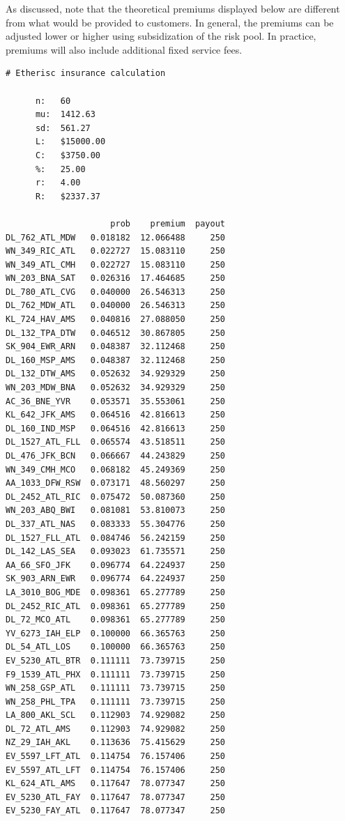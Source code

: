 \documentclass[12pt]{article}
\begin{document}
As discussed, note that the theoretical premiums displayed below are different from what would be provided to customers. In general, the premiums can be adjusted lower or higher using subsidization of the risk pool. In practice, premiums will also include additional fixed service fees.

\begin{verbatim}# Etherisc insurance calculation

      n:   60
      mu:  1412.63
      sd:  561.27
      L:   $15000.00
      C:   $3750.00
      %:   25.00
      r:   4.00
      R:   $2337.37
    
                     prob    premium  payout
DL_762_ATL_MDW   0.018182  12.066488     250
WN_349_RIC_ATL   0.022727  15.083110     250
WN_349_ATL_CMH   0.022727  15.083110     250
WN_203_BNA_SAT   0.026316  17.464685     250
DL_780_ATL_CVG   0.040000  26.546313     250
DL_762_MDW_ATL   0.040000  26.546313     250
KL_724_HAV_AMS   0.040816  27.088050     250
DL_132_TPA_DTW   0.046512  30.867805     250
SK_904_EWR_ARN   0.048387  32.112468     250
DL_160_MSP_AMS   0.048387  32.112468     250
DL_132_DTW_AMS   0.052632  34.929329     250
WN_203_MDW_BNA   0.052632  34.929329     250
AC_36_BNE_YVR    0.053571  35.553061     250
KL_642_JFK_AMS   0.064516  42.816613     250
DL_160_IND_MSP   0.064516  42.816613     250
DL_1527_ATL_FLL  0.065574  43.518511     250
DL_476_JFK_BCN   0.066667  44.243829     250
WN_349_CMH_MCO   0.068182  45.249369     250
AA_1033_DFW_RSW  0.073171  48.560297     250
DL_2452_ATL_RIC  0.075472  50.087360     250
WN_203_ABQ_BWI   0.081081  53.810073     250
DL_337_ATL_NAS   0.083333  55.304776     250
DL_1527_FLL_ATL  0.084746  56.242159     250
DL_142_LAS_SEA   0.093023  61.735571     250
AA_66_SFO_JFK    0.096774  64.224937     250
SK_903_ARN_EWR   0.096774  64.224937     250
LA_3010_BOG_MDE  0.098361  65.277789     250
DL_2452_RIC_ATL  0.098361  65.277789     250
DL_72_MCO_ATL    0.098361  65.277789     250
YV_6273_IAH_ELP  0.100000  66.365763     250
DL_54_ATL_LOS    0.100000  66.365763     250
EV_5230_ATL_BTR  0.111111  73.739715     250
F9_1539_ATL_PHX  0.111111  73.739715     250
WN_258_GSP_ATL   0.111111  73.739715     250
WN_258_PHL_TPA   0.111111  73.739715     250
LA_800_AKL_SCL   0.112903  74.929082     250
DL_72_ATL_AMS    0.112903  74.929082     250
NZ_29_IAH_AKL    0.113636  75.415629     250
EV_5597_LFT_ATL  0.114754  76.157406     250
EV_5597_ATL_LFT  0.114754  76.157406     250
KL_624_ATL_AMS   0.117647  78.077347     250
EV_5230_ATL_FAY  0.117647  78.077347     250
EV_5230_FAY_ATL  0.117647  78.077347     250

\end{verbatim}
\end{document}
